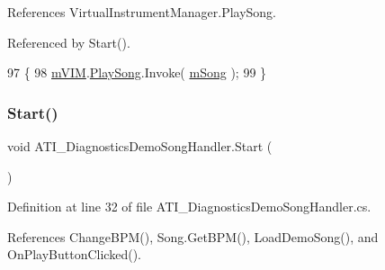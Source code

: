 References Virtual\+Instrument\+Manager.\+Play\+Song.



Referenced by Start().


\begin{DoxyCode}
97     \{
98         \hyperlink{class_a_t_i___diagnostics_demo_song_handler_ac3a2216a6de2023d3dd19caa25de7d6f}{mVIM}.\hyperlink{group___v_i_m_events_gae450bdba9c513ab4e43f69def50fa84d}{PlaySong}.Invoke( \hyperlink{class_a_t_i___diagnostics_demo_song_handler_a8d34a075cf131a43db5e81cba4c9ea9d}{mSong} );
99     \}
\end{DoxyCode}
\mbox{\label{class_a_t_i___diagnostics_demo_song_handler_a86f25504d9704a3f330328c476f890c4}} 
\subsubsection{\texorpdfstring{Start()}{Start()}}
{\footnotesize\ttfamily void A\+T\+I\+\_\+\+Diagnostics\+Demo\+Song\+Handler.\+Start (\begin{DoxyParamCaption}{ }\end{DoxyParamCaption})\hspace{0.3cm}{\ttfamily [private]}}



Definition at line 32 of file A\+T\+I\+\_\+\+Diagnostics\+Demo\+Song\+Handler.\+cs.



References Change\+B\+P\+M(), Song.\+Get\+B\+P\+M(), Load\+Demo\+Song(), and On\+Play\+Button\+Clicked().


